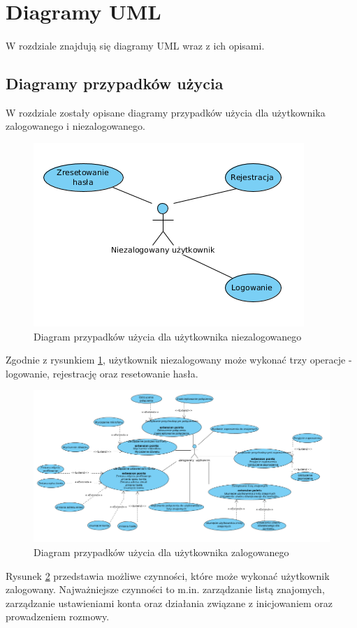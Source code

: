 \documentclass{article}
\begin{document}
    \section{Diagramy UML}
    \paragraph{} W rozdziale znajdują się diagramy UML wraz z ich opisami.

    \subsection{Diagramy przypadków użycia}
    W rozdziale zostały opisane diagramy przypadków użycia dla użytkownika zalogowanego i niezalogowanego.

    \begin{figure}[H]
      \centering
        \includegraphics[width=1.0\linewidth]{assets/dpu1.png}
        \caption[]{Diagram przypadków użycia dla użytkownika niezalogowanego}
        \label{fig:dpu1}
    \end{figure}

    Zgodnie z rysunkiem \ref{fig:dpu1}, użytkownik niezalogowany może wykonać trzy operacje - logowanie, rejestrację oraz resetowanie hasła.

    \begin{figure}[H]
      \centering
        \includegraphics[width=1.0\linewidth]{assets/dpu2.png}
        \caption[]{Diagram przypadków użycia dla użytkownika zalogowanego}
        \label{fig:dpu2}
    \end{figure}

    Rysunek \ref{fig:dpu2} przedstawia możliwe czynności, które może wykonać użytkownik zalogowany. Najważniejsze czynności to m.in. zarządzanie listą znajomych, zarządzanie ustawieniami konta oraz działania związane z inicjowaniem oraz prowadzeniem rozmowy.
\end{document}
